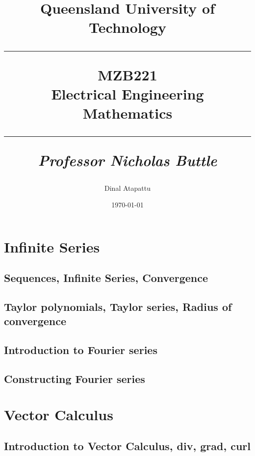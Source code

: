 \documentclass{book}
\begin{document}
    \title{
            Queensland University of Technology\\
            \rule{\linewidth}{0.5pt}
        \centering
        \textbf{MZB221} \\
        Electrical Engineering Mathematics\\
        \vspace{0.4cm}
        \rule{\linewidth}{1.5pt}
        \small{\textit{Professor Nicholas Buttle}}
    }
    \author{Dinal Atapattu}
    \date{\today}
    \maketitle
    \thispagestyle{empty}
    \tableofcontents
    \chapter{Infinite Series}
        \section{Sequences, Infinite Series, Convergence}
        \section{Taylor polynomials, Taylor series, Radius of convergence}
        \section{Introduction to Fourier series}
        \section{Constructing Fourier series}
    \chapter{Vector Calculus}
        \section{Introduction to Vector Calculus, div, grad, curl}
\end{document}

